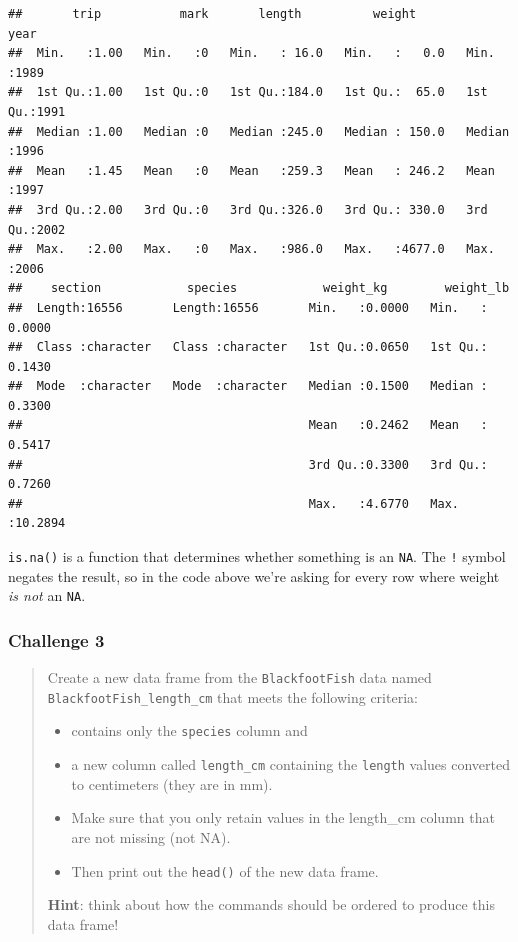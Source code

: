 \documentclass[
  10pt,
  letterpaper,
  twoside,
  openright]{book}
\providecommand{\tightlist}{%
  \setlength{\itemsep}{0pt}\setlength{\parskip}{0pt}}
\begin{document}
\begin{verbatim}
##       trip           mark       length          weight            year     
##  Min.   :1.00   Min.   :0   Min.   : 16.0   Min.   :   0.0   Min.   :1989  
##  1st Qu.:1.00   1st Qu.:0   1st Qu.:184.0   1st Qu.:  65.0   1st Qu.:1991  
##  Median :1.00   Median :0   Median :245.0   Median : 150.0   Median :1996  
##  Mean   :1.45   Mean   :0   Mean   :259.3   Mean   : 246.2   Mean   :1997  
##  3rd Qu.:2.00   3rd Qu.:0   3rd Qu.:326.0   3rd Qu.: 330.0   3rd Qu.:2002  
##  Max.   :2.00   Max.   :0   Max.   :986.0   Max.   :4677.0   Max.   :2006  
##    section            species            weight_kg        weight_lb      
##  Length:16556       Length:16556       Min.   :0.0000   Min.   : 0.0000  
##  Class :character   Class :character   1st Qu.:0.0650   1st Qu.: 0.1430  
##  Mode  :character   Mode  :character   Median :0.1500   Median : 0.3300  
##                                        Mean   :0.2462   Mean   : 0.5417  
##                                        3rd Qu.:0.3300   3rd Qu.: 0.7260  
##                                        Max.   :4.6770   Max.   :10.2894
\end{verbatim}

\texttt{is.na()} is a function that determines whether something is an
\texttt{NA}. The \texttt{!} symbol negates the result, so in the code
above we're asking for every row where weight \emph{is not} an
\texttt{NA}.

\hypertarget{challenge-3}{%
\subsubsection{Challenge 3}\label{challenge-3}}

\begin{quote}
Create a new data frame from the \texttt{BlackfootFish} data named
\texttt{BlackfootFish\_length\_cm} that meets the following criteria:

\begin{itemize}
\tightlist
\item
  contains only the \texttt{species} column and
\item
  a new column called \texttt{length\_cm} containing the \texttt{length}
  values converted to centimeters (they are in mm).
\item
  Make sure that you only retain values in the length\_cm column that
  are not missing (not NA).
\item
  Then print out the \texttt{head()} of the new data frame.
\end{itemize}

\textbf{Hint}: think about how the commands should be ordered to produce
this data frame!
\end{quote}
\end{document}
